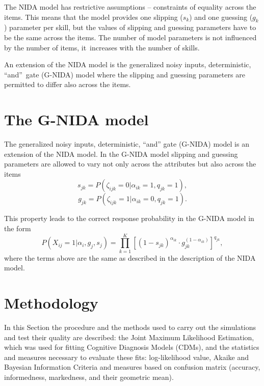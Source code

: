 \documentclass[english]{pwr_wmat_praca_dyplomowa}
\theoremstyle{plain}
\numberwithin{theorem}{chapter}
\theoremstyle{definition}
\numberwithin{theorem}{chapter}
\begin{document}
	The NIDA model has restrictive assumptions -- constraints of equality across the items. This means that the model provides one slipping ($s_k$) and one guessing ($g_k$) parameter per skill, but the values of slipping and guessing parameters have to be the same across the items. The number of model parameters is not influenced by the number of items, it~increases with the number of skills. 
	
	An extension of the NIDA model is the generalized noisy inputs, deterministic, ``and''~gate (G-NIDA) model where the slipping and guessing parameters are permitted to differ also across the items. 
	
	\section{The G-NIDA model}
	
	The generalized noisy inputs, deterministic, ``and'' gate (G-NIDA) model is an extension of the NIDA model. In the G-NIDA model slipping and guessing parameters are allowed to vary not only across the attributes but also across the items
	\begin{equation}
	s_{jk} = P(\zeta_{ijk} = 0 | \alpha_{ik} = 1, q_{jk} = 1),
	\end{equation}
	\begin{equation}
	g_{jk} = P(\zeta_{ijk} = 1 | \alpha_{ik} = 0, q_{jk} = 1).
	\end{equation}
	
	\noindent This property leads to the correct response probability in the G-NIDA model in the form
	\begin{equation}
	P(X_{ij} = 1 | \alpha_i, g_j, s_j) = \prod\limits_{k=1}^{K} \left[ (1-s_{jk})^{\alpha_{ik}} \cdot g_{jk}^{(1-\alpha_{ik})} \right] ^{q_{jk}},
	\end{equation}
	where the terms above are the same as described in the description of the NIDA model.
	
	\section{Methodology}
	
	In this Section the procedure and the methods used to carry out the simulations and test their quality are described: the Joint Maximum Likelihood Estimation, which was used for fitting Cognitive Diagnosis Models (CDMs), and the statistics and measures necessary to evaluate these fits: log-likelihood value, Akaike and Bayesian Information Criteria and measures based on confusion matrix (accuracy, informedness, markedness, and their geometric mean).
	
\end{document}

